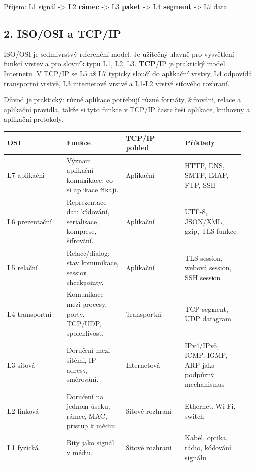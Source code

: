 Příjem: L1 signál -> L2 \textbf{rámec} -> L3 \textbf{paket} -> L4 \textbf{segment} -> L7 data

\subsection*{2. ISO/OSI a TCP/IP}

ISO/OSI je sedmivrstvý referenční model. Je užitečný hlavně pro vysvětlení funkcí vrstev a pro slovník typu L1, L2, L3. \textbf{TCP}/IP je praktický model Internetu. V TCP/IP se L5 až L7 typicky sloučí do aplikační vrstvy, L4 odpovídá transportní vrstvě, L3 internetové vrstvě a L1-L2 vrstvě síťového rozhraní.

Důvod je praktický: různé aplikace potřebují různé formáty, šifrování, relace a aplikační pravidla, takže si tyto funkce v TCP/IP často řeší aplikace, knihovny a aplikační protokoly.

\begin{longtable}{p{0.237\linewidth}p{0.237\linewidth}p{0.237\linewidth}p{0.237\linewidth}}
\toprule
\textbf{OSI} & \textbf{Funkce} & \textbf{TCP/IP pohled} & \textbf{Příklady} \\
\midrule\endhead
L7 aplikační & Význam aplikační komunikace: co si aplikace říkají. & Aplikační & HTTP, DNS, SMTP, IMAP, FTP, SSH \\
\addlinespace
L6 prezentační & Reprezentace dat: kódování, serializace, komprese, šifrování. & Aplikační & UTF-8, JSON/XML, gzip, TLS funkce \\
\addlinespace
L5 relační & Relace/dialog: stav komunikace, session, checkpointy. & Aplikační & TLS session, webová session, SSH session \\
\addlinespace
L4 transportní & Komunikace mezi procesy, porty, TCP/UDP, spolehlivost. & Transportní & TCP segment, UDP datagram \\
\addlinespace
L3 síťová & Doručení mezi sítěmi, IP adresy, směrování. & Internetová & IPv4/IPv6, ICMP, IGMP, ARP jako podpůrný mechanismus \\
\addlinespace
L2 linková & Doručení na jednom úseku, rámce, MAC, přístup k médiu. & Síťové rozhraní & Ethernet, Wi-Fi, switch \\
\addlinespace
L1 fyzická & Bity jako signál v médiu. & Síťové rozhraní & Kabel, optika, rádio, kódování signálu \\
\addlinespace
\bottomrule
\end{longtable}


